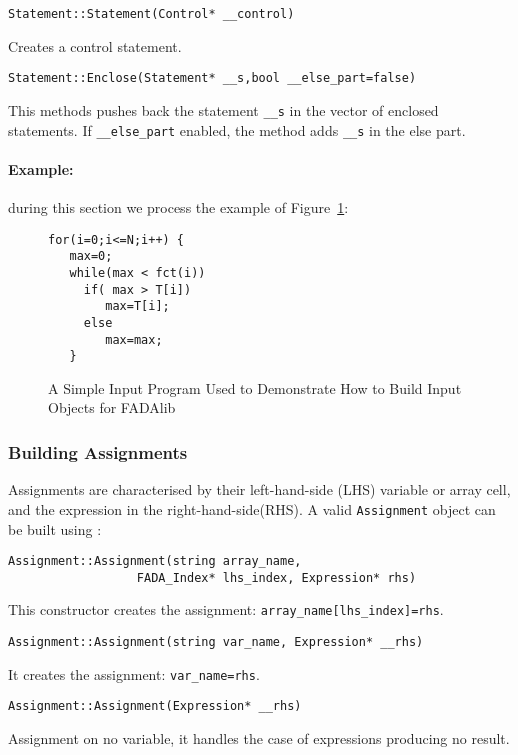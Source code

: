 \begin{lstlisting}[frame=single,framerule=0pt]
Statement::Statement(Control* __control)
\end{lstlisting}
Creates a control statement.\\

\begin{lstlisting}[frame=single,framerule=0pt]
Statement::Enclose(Statement* __s,bool __else_part=false)
\end{lstlisting}
This methods pushes back the statement \verb|__s| in the vector of enclosed statements. If \verb|__else_part| enabled, the method adds \verb|__s| in the else part. \\


\paragraph{Example:} during this section we process the example of Figure~\ref{pgm:max2}:

\begin{figure}

\begin{lstlisting}[frame=single,framerule=0pt]
for(i=0;i<=N;i++) {
   max=0;
   while(max < fct(i))
     if( max > T[i])
        max=T[i];
     else
        max=max;
   }
\end{lstlisting}
\caption{A Simple Input Program Used to Demonstrate How to Build Input Objects for FADAlib}
\label{pgm:max2}
\end{figure}


\subsubsection{Building Assignments}
Assignments are characterised by their left-hand-side (LHS) variable or array cell, and the expression in the right-hand-side(RHS). A valid \verb|Assignment| object can be built using :
\begin{lstlisting}[frame=single,framerule=0pt]
Assignment::Assignment(string array_name,
                  FADA_Index* lhs_index, Expression* rhs) 
\end{lstlisting}
This constructor creates the assignment: \verb|array_name[lhs_index]=rhs|.
\begin{lstlisting}[frame=single,framerule=0pt]
Assignment::Assignment(string var_name, Expression* __rhs) 
\end{lstlisting}
It creates the assignment: \verb|var_name=rhs|.
\begin{lstlisting}[frame=single,framerule=0pt]
Assignment::Assignment(Expression* __rhs) 
\end{lstlisting}
Assignment on no variable, it handles the case of expressions producing no result.

